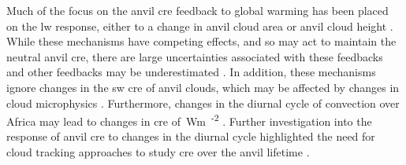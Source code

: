 Much of the focus on the anvil \acrshort{cre} feedback to global warming has been placed on the \acrshort{lw} response, either to a change in anvil cloud area \citep{lindzen_does_2001, bony_thermodynamic_2016} or anvil cloud height \citep{hartmann_important_2002, seeley_fat_2019}.
While these mechanisms have competing effects, and so may act to maintain the neutral anvil \acrshort{cre}, there are large uncertainties associated with these feedbacks \citep{sherwood_assessment_2020} and other feedbacks may be underestimated \citep{hill_climate_2023}.
In addition, these mechanisms ignore changes in the \acrshort{sw} \acrshort{cre} of anvil clouds, which may be affected by changes in cloud microphysics \citep{ramanathan_cloud-radiative_1989, gasparini_opinion_2023}.
Furthermore, changes in the diurnal cycle of convection over Africa may lead to changes in \acrshort{cre} of \,\unit{Wm\textsuperscript{-2}} \citep{nowicki_observations_2004}.
Further investigation into the response of anvil \acrshort{cre} to changes in the diurnal cycle highlighted the need for cloud tracking approaches to study \acrshort{cre} over the anvil lifetime \citep{bouniol_macrophysical_2016, bouniol_life_2021}.


